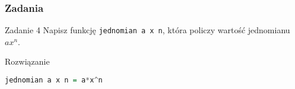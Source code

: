 \begin{frame}[fragile]
  \frametitle{Zadania}
  \begin{block}{Zadanie 4}
    Napisz funkcję \texttt{jednomian a x n}, która policzy wartość jednomianu
    $ax^n$.
  \end{block}
  \vspace{1em}
  \pause

  \begin{block}{Rozwiązanie}
    \begin{lstlisting}[language=Haskell]
jednomian a x n = a*x^n
    \end{lstlisting}
  \end{block}
\end{frame}
